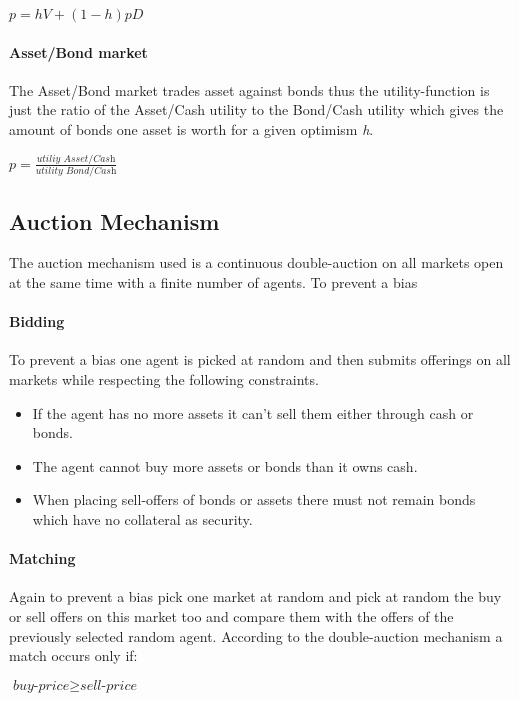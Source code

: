 \documentclass[../Bachelorarbeit.tex]{subfiles}
\begin{document}
\begin{center}
$p = h V + ( 1 - h )pD$
\end{center}

\paragraph{Asset/Bond market}
The Asset/Bond market trades asset against bonds thus the utility-function is just the ratio of the Asset/Cash utility to the Bond/Cash utility which gives the amount of bonds one asset is worth for a given optimism \textit{h}.

\begin{center}
$p = \frac{\textit{utiliy Asset/Cash}}{\textit{utility Bond/Cash}}$
\end{center}

\subsection{Auction Mechanism}
The auction mechanism used is a continuous double-auction on all markets open at the same time with a finite number of agents. To prevent a bias

\paragraph{Bidding}
To prevent a bias one agent is picked at random and then submits offerings on all markets while respecting the following constraints.

\begin{itemize}
\item If the agent has no more assets it can't sell them either through cash or bonds.
\item The agent cannot buy more assets or bonds than it owns cash.
\item When placing sell-offers of bonds or assets there must not remain bonds which have no collateral as security. 
\end{itemize}

\paragraph{Matching}
Again to prevent a bias pick one market at random and pick at random the buy or sell offers on this market too and compare them with the offers of the previously selected random agent. According to the double-auction mechanism a match occurs only if:

\begin{center}
$\textit{buy-price} \geq \textit{sell-price}$
\end{center}
\end{document}
